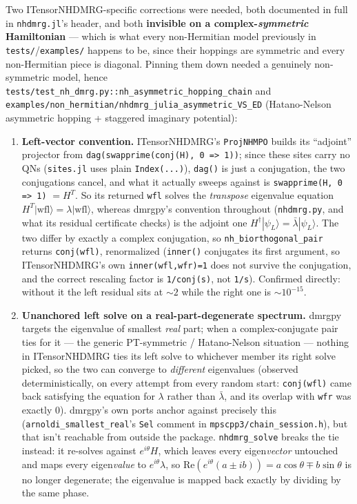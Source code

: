 \documentclass[11pt]{article}
\begin{document}
Two ITensorNHDMRG-specific corrections were needed, both documented in
full in \texttt{nhdmrg.jl}'s header, and both \textbf{invisible on a
complex-\emph{symmetric} Hamiltonian} --- which is what every
non-Hermitian model previously in \texttt{tests/}/\texttt{examples/}
happens to be, since their hoppings are symmetric and every non-Hermitian
piece is diagonal. Pinning them down needed a genuinely non-symmetric
model, hence
\lstinline|tests/test_nh_dmrg.py::nh_asymmetric_hopping_chain| and
\texttt{examples/non\_hermitian/nhdmrg\_julia\_asymmetric\_VS\_ED}
(Hatano-Nelson asymmetric hopping + staggered imaginary potential):

\begin{enumerate}
\item \textbf{Left-vector convention.} ITensorNHDMRG's
  \lstinline|ProjNHMPO| builds its ``adjoint'' projector from
  \lstinline|dag(swapprime(conj(H), 0 => 1))|; since these sites carry no
  QNs (\texttt{sites.jl} uses plain \lstinline|Index(...)|),
  \lstinline|dag()| is just a conjugation, the two conjugations cancel,
  and what it actually sweeps against is
  \lstinline|swapprime(H, 0 => 1)| $=H^{T}$. So its returned
  \lstinline|wfl| solves the \emph{transpose} eigenvalue equation
  $H^{T}|\mathrm{wfl}\rangle=\lambda|\mathrm{wfl}\rangle$, whereas
  dmrgpy's convention throughout (\texttt{nhdmrg.py}, and what its
  residual certificate checks) is the adjoint one
  $H^{\dagger}|\psi_L\rangle=\bar\lambda|\psi_L\rangle$. The two differ by
  exactly a complex conjugation, so \lstinline|nh_biorthogonal_pair|
  returns \lstinline|conj(wfl)|, renormalized (\lstinline|inner()|
  conjugates its first argument, so ITensorNHDMRG's own
  \lstinline|inner(wfl,wfr)=1| does not survive the conjugation, and the
  correct rescaling factor is \lstinline|1/conj(s)|, not
  \lstinline|1/s|). Confirmed directly: without it the left residual sits
  at $\sim2$ while the right one is $\sim10^{-15}$.
\item \textbf{Unanchored left solve on a real-part-degenerate spectrum.}
  dmrgpy targets the eigenvalue of smallest \emph{real} part; when a
  complex-conjugate pair ties for it --- the generic PT-symmetric /
  Hatano-Nelson situation --- nothing in ITensorNHDMRG ties its left
  solve to whichever member its right solve picked, so the two can
  converge to \emph{different} eigenvalues (observed deterministically,
  on every attempt from every random start: \lstinline|conj(wfl)| came
  back satisfying the equation for $\lambda$ rather than $\bar\lambda$,
  and its overlap with \lstinline|wfr| was exactly 0). dmrgpy's own ports
  anchor against precisely this (\lstinline|arnoldi_smallest_real|'s
  \lstinline|Sel| comment in \texttt{mpscpp3/chain\_session.h}), but that
  isn't reachable from outside the package. \lstinline|nhdmrg_solve|
  breaks the tie instead: it re-solves against $e^{i\theta}H$, which
  leaves every eigen\emph{vector} untouched and maps every
  eigen\emph{value} to $e^{i\theta}\lambda$, so
  $\mathrm{Re}(e^{i\theta}(a\pm ib))=a\cos\theta\mp b\sin\theta$ is no
  longer degenerate; the eigenvalue is mapped back exactly by dividing by
  the same phase.


\end{enumerate}
\end{document}
